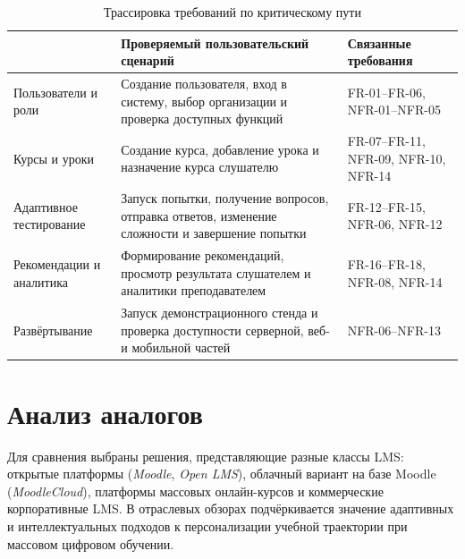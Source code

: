 \begin{table}[H]
\centering
\caption{Трассировка требований по критическому пути}
\label{tab:req-trace}
{\fontsize{12pt}{12pt}\selectfont
\setlength{\tabcolsep}{5pt}
\renewcommand{\arraystretch}{1.15}
\begin{tabularx}{\textwidth}{|>{\RaggedRight\arraybackslash}p{32mm}|>{\RaggedRight\arraybackslash}X|>{\RaggedRight\arraybackslash}p{34mm}|}
\hline
{\centering\arraybackslash\textbf{Группа требований}} & {\centering\arraybackslash\textbf{Проверяемый пользовательский сценарий}} & {\centering\arraybackslash\textbf{Связанные требования}} \\
\hline
Пользователи и роли & Создание пользователя, вход в систему, выбор организации и проверка доступных функций & FR-01--FR-06, NFR-01--NFR-05 \\
\hline
Курсы и уроки & Создание курса, добавление урока и назначение курса слушателю & FR-07--FR-11, NFR-09, NFR-10, NFR-14 \\
\hline
Адаптивное тестирование & Запуск попытки, получение вопросов, отправка ответов, изменение сложности и завершение попытки & FR-12--FR-15, NFR-06, NFR-12 \\
\hline
Рекомендации и аналитика & Формирование рекомендаций, просмотр результата слушателем и аналитики преподавателем & FR-16--FR-18, NFR-08, NFR-14 \\
\hline
Развёртывание & Запуск демонстрационного стенда и проверка доступности серверной, веб- и мобильной частей & NFR-06--NFR-13 \\
\hline
\end{tabularx}
}
\end{table}

\section{Анализ аналогов}

Для сравнения выбраны решения, представляющие разные классы LMS: открытые платформы (\textit{Moodle}, \textit{Open LMS}), облачный вариант на базе Moodle (\textit{MoodleCloud}), платформы массовых онлайн-курсов и коммерческие корпоративные LMS\cite{moodle_lms,open_lms,moodlecloud,docebo_adaptive_2026}. В отраслевых обзорах подчёркивается значение адаптивных и интеллектуальных подходов к персонализации учебной траектории при массовом цифровом обучении\cite{educause_adaptive_2016,discovery_intelligent_adaptive}.

